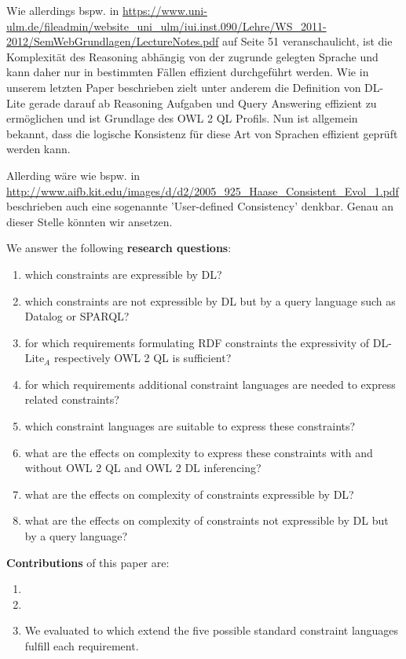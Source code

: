 \documentclass{llncs}
\begin{document}
Wie allerdings bspw. in 
\url{https://www.uni-ulm.de/fileadmin/website_uni_ulm/iui.inst.090/Lehre/WS_2011-2012/SemWebGrundlagen/LectureNotes.pdf}
auf Seite 51 veranschaulicht, ist die Komplexität des Reasoning abhängig von der zugrunde gelegten Sprache und kann daher nur in bestimmten Fällen effizient durchgeführt werden. Wie in unserem letzten Paper beschrieben zielt unter anderem die Definition von DL-Lite gerade darauf ab Reasoning Aufgaben und Query Answering effizient zu ermöglichen und ist Grundlage des OWL 2 QL Profils. Nun ist allgemein bekannt, dass die logische Konsistenz für diese Art von Sprachen effizient geprüft werden kann. 

Allerding wäre wie bspw. in 
\url{http://www.aifb.kit.edu/images/d/d2/2005_925_Haase_Consistent_Evol_1.pdf} beschrieben auch eine sogenannte 'User-defined Consistency' denkbar. Genau an dieser Stelle könnten wir ansetzen.

We answer the following \textbf{research questions}:
\begin{enumerate}
	\item which constraints are expressible by DL?
	\item which constraints are not expressible by DL but by a query language such as Datalog or SPARQL?
	\item for which requirements formulating RDF constraints the expressivity of DL-Lite$_A$ respectively OWL 2 QL is sufficient?
	\item for which requirements additional constraint languages are needed to express related constraints?
	\item which constraint languages are suitable to express these constraints?
	\item what are the effects on complexity to express these constraints with and without OWL 2 QL and OWL 2 DL inferencing?
	\item what are the effects on complexity of constraints expressible by DL?
	\item what are the effects on complexity of constraints not expressible by DL but by a query language?
\end{enumerate}

\textbf{Contributions} of this paper are:
\begin{enumerate}
  \item
	\item
	\item We evaluated to which extend the five possible standard constraint languages fulfill each requirement.
\end{enumerate}
\end{document}
